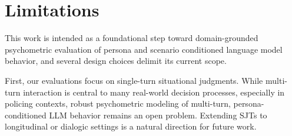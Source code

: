 \documentclass[11pt]{article}
\begin{document}



\section{Limitations}
This work is intended as a foundational step toward domain-grounded psychometric evaluation of persona and scenario conditioned language model behavior, and several design choices delimit its current scope. 

First, our evaluations focus on single-turn situational judgments. While multi-turn interaction is central to many real-world decision processes, especially in policing contexts, robust psychometric modeling of multi-turn, persona-conditioned LLM behavior remains an open problem. Extending SJTs to longitudinal or dialogic settings is a natural direction for future work.
\end{document}
